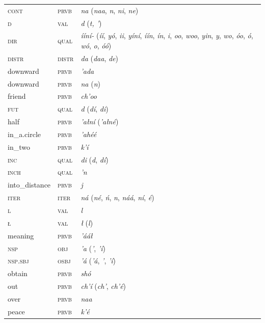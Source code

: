\begin{xltabular}{\textwidth}{llX}
 \textsc{cont} & \textsc{prvb} & \textit{na} (\textit{naa}, \textit{n}, \textit{ni}, \textit{ne})\\
 \textsc{d} & \textsc{val} & \textit{d} (\textit{t,  ’})\\
 \textsc{dir} & \textsc{qual} & \textit{ííní-} (\textit{íí}, \textit{yó}, \textit{ii}, \textit{yíní}, \textit{íín}, \textit{ín}, \textit{i}, \textit{oo}, \textit{woo}, \textit{yin}, \textit{y}, \textit{wo}, \textit{óo}, \textit{ó}, \textit{wó}, \textit{o}, \textit{óó})\\
 \textsc{distr} & \textsc{distr} & \textit{da} (\textit{daa}, \textit{de})\\
 downward & \textsc{prvb} & \textit{’ada}\\
 downward & \textsc{prvb} & \textit{na} (\textit{n})\\
 friend & \textsc{prvb} & \textit{ch’oo}\\
 \textsc{fut} & \textsc{qual} & \textit{d} (\textit{dí}, \textit{di})\\
 half & \textsc{prvb} & \textit{’ałní} (\textit{’ałné})\\
 in\_a.circle & \textsc{prvb} & \textit{’ahéé}\\
 in\_two & \textsc{prvb} & \textit{k’í}\\
 \textsc{inc} & \textsc{qual} & \textit{di} (\textit{d}, \textit{dí})\\
 \textsc{inch} & \textsc{qual} & \textit{’n}\\
 into\_distance & \textsc{prvb} & \textit{j}\\
 \textsc{iter} & \textsc{iter} & \textit{ná} (\textit{né}, \textit{ń}, \textit{n}, \textit{náá}, \textit{ní}, \textit{é})\\
 \textsc{l} & \textsc{val} & \textit{l}\\
 \textsc{ł} & \textsc{val} & \textit{ł} (\textit{l})\\
 meaning & \textsc{prvb} & \textit{’ááł}\\
 \textsc{nsp} & \textsc{obj} & \textit{’a} (\textit{’}, \textit{’í})\\
 \textsc{nsp}.\textsc{sbj} & \textsc{osbj} & \textit{’á} (\textit{’á}, \textit{’}, \textit{’í})\\
 obtain & \textsc{prvb} & \textit{shó}\\
 out & \textsc{prvb} & \textit{ch’í} (\textit{ch’}, \textit{ch’é})\\
 over & \textsc{prvb} & \textit{naa}\\
 peace & \textsc{prvb} & \textit{k’é}\\

\end{xltabular}
